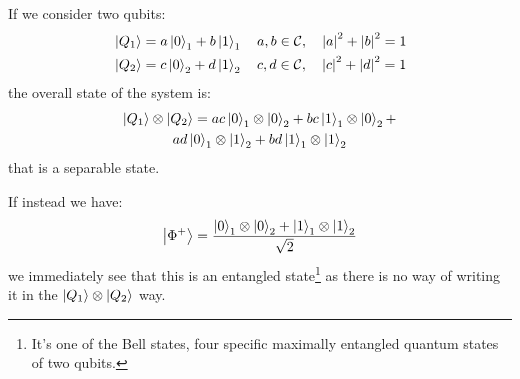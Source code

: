 
If we consider two qubits:
\begin{align*}
    &\ket{Q_1} = a \ket{0}_1 + b \ket{1}_1 \quad a, b \in \mathcal{C}, \quad \abs{a}^2 + \abs{b}^2 = 1 \\
    &\ket{Q_2} = c\ket{0}_2 + d\ket{1}_2 \quad c,d \in \mathcal{C}, \quad \abs{c}^2 + \abs{d}^2 = 1
\end{align*}
the overall state of the system is:
\begin{multline*}
    \ket{Q_1} \otimes \ket{Q_2} = ac \ket{0}_1 \otimes \ket{0}_2 +  bc  \ket{1}_1 \otimes \ket{0}_2 + \\ 
    ad \ket{0}_1 \otimes \ket{1}_2 + bd \ket{1}_1 \otimes \ket{1}_2
\end{multline*}
that is a separable state.

If instead we have:
\begin{equation*}
    \ket{\Phi^+} = \frac{\ket{0}_1 \otimes \ket{0}_2 + \ket{1}_1 \otimes \ket{1}_2}{\sqrt{2}}
\end{equation*}
we immediately see that this is an entangled state\footnote{It's one of the Bell states, four specific maximally entangled quantum states of two qubits.} as there is no way of writing it in the $\ket{Q_1} \otimes \ket{Q_2}$ way. 